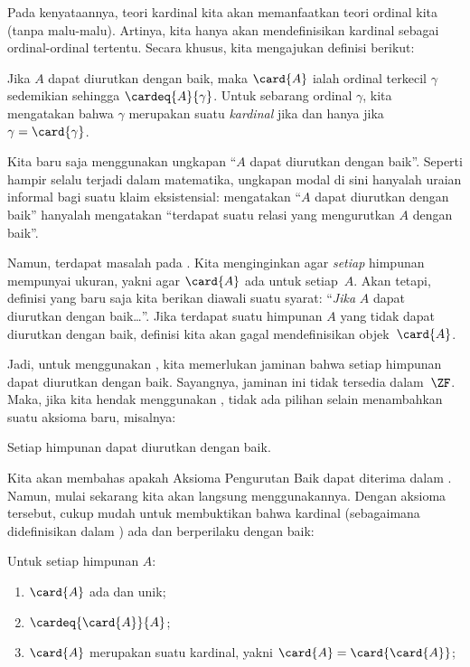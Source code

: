 \documentclass[../../../include/open-logic-section]{subfiles}
\begin{document}

Pada kenyataannya, teori kardinal kita akan memanfaatkan teori ordinal kita
(tanpa malu-malu). Artinya, kita hanya akan mendefinisikan kardinal sebagai
ordinal-ordinal tertentu. Secara khusus, kita mengajukan definisi berikut:

\begin{defn}
Jika $A$ dapat diurutkan dengan baik, maka $\card{A}$ ialah ordinal terkecil
$\gamma$ sedemikian sehingga $\cardeq{A}{\gamma}$. Untuk sebarang ordinal
$\gamma$, kita mengatakan bahwa $\gamma$ merupakan suatu \emph{kardinal}
jika dan hanya jika $\gamma = \card{\gamma}$.
\end{defn}

Kita baru saja menggunakan ungkapan ``$A$ dapat diurutkan dengan baik''.
Seperti hampir selalu terjadi dalam matematika, ungkapan modal di sini
hanyalah uraian informal bagi suatu klaim eksistensial: mengatakan ``$A$
dapat diurutkan dengan baik'' hanyalah mengatakan ``terdapat suatu relasi
yang mengurutkan $A$ dengan baik''.

Namun, terdapat masalah pada . Kita menginginkan
agar \emph{setiap} himpunan mempunyai ukuran, yakni agar $\card{A}$ ada untuk
setiap~$A$. Akan tetapi, definisi yang baru saja kita berikan diawali suatu
syarat: ``\emph{Jika} $A$ dapat diurutkan dengan baik\ldots''. Jika terdapat
suatu himpunan $A$ yang tidak dapat diurutkan dengan baik, definisi kita akan
gagal mendefinisikan objek~$\card{A}$.

Jadi, untuk menggunakan , kita memerlukan jaminan
bahwa setiap himpunan dapat diurutkan dengan baik. Sayangnya, jaminan ini
tidak tersedia dalam~$\ZF$. Maka, jika kita hendak menggunakan
, tidak ada pilihan selain menambahkan suatu
aksioma baru, misalnya:
\begin{axiom}
Setiap himpunan dapat diurutkan dengan baik.
\end{axiom}
Kita akan membahas apakah Aksioma Pengurutan Baik dapat diterima dalam
. Namun, mulai sekarang kita akan langsung
menggunakannya. Dengan aksioma tersebut, cukup mudah untuk membuktikan bahwa
kardinal (sebagaimana didefinisikan dalam ) ada
dan berperilaku dengan baik:

\begin{lem}
Untuk setiap himpunan $A$:
\begin{enumerate}
	\item{} $\card{A}$ ada dan unik;
	\item{}  $\cardeq{\card{A}}{A}$;
	\item{}  $\card{A}$ merupakan suatu kardinal, yakni
	$\card{A} = \card{\card{A}}$;
\end{enumerate}
\end{lem}
\end{document}
